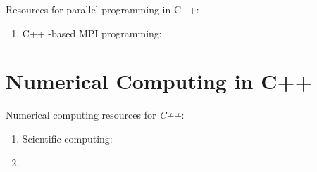 Resources for parallel programming in C++: \vspace{-0.3cm}
\begin{enumerate} \itemsep -4pt
\item C++ -based MPI programming: \cite{Karniadakis2003}
\end{enumerate}











\section{Numerical Computing in C++}
\label{sec:NumericalComputingInCpp}

Numerical computing resources for {\it C++}: \vspace{-0.3cm}
\begin{enumerate} \itemsep -4pt
\item Scientific computing: \cite{PittFrancis2012}
\item 
\end{enumerate}

















